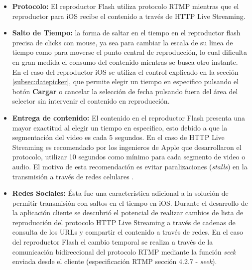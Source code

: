 \begin{itemize}
\item \textbf{Protocolo:} El reproductor Flash utiliza protocolo RTMP mientras que el reproductor para iOS recibe el contenido a través de HTTP Live Streaming.
\item \textbf{Salto de Tiempo:} la forma de saltar en el tiempo en el reproductor flash precisa de clicks con mouse, ya sea para cambiar la escala de su linea de tiempo como para moverse el punto central de reproducción, lo cual dificulta en gran medida el consumo del contenido mientras se busca otro instante.\\

En el caso del reproductor iOS se utiliza el control explicado en la sección \ref{subsec:datepicker}, que permite elegir un tiempo en especifico pulsando el botón \textbf{Cargar} o cancelar la selección de fecha pulsando fuera del área del selector sin intervenir el contenido en reproducción.

\item \textbf{Entrega de contenido:} El contenido en el reproductor Flash presenta una mayor exactitud al elegir un tiempo en especifico, esto debido a que la segmentación del video es cada 5 segundos. En el caso de HTTP Live Streaming es recomendado por los ingenieros de Apple que desarrollaron el protocolo, utilizar 10 segundos como mínimo para cada segmento de video o audio. El motivo de esta recomendación es evitar paralizaciones (\textit{stalls}) en la transmisión a través de redes celulares \cite{bib:tensec-targetduration}.\\

\item \textbf{Redes Sociales:} Ésta fue una característica adicional a la solución de permitir transmisión con saltos en el tiempo en iOS. Durante el desarrollo de la aplicación cliente se descubrió el potencial de realizar cambios de lista de reproducción del protocolo HTTP Live Streaming a través de cadenas de consulta de los URLs y compartir el contenido a través de redes. En el caso del reproductor Flash el cambio temporal se realiza a través de la comunicación bidireccional del protocolo RTMP mediante la función \textit{seek} enviada desde el cliente (especificación RTMP \cite{bib:rtmp-specs} sección 4.2.7 - \textit{seek}).
\end{itemize}



